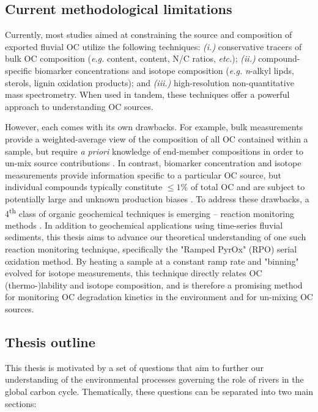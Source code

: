 \subsection{Current methodological limitations}

Currently, most studies aimed at constraining the source and composition of exported fluvial OC utilize the following techniques: \textit{(i.)} conservative tracers of bulk OC composition (\textit{e.g.}  content,  content, N/C ratios, \textit{etc.}); \textit{(ii.)} compound-specific biomarker concentrations and isotope composition (\textit{e.g.} \textit{n}-alkyl lipds, sterols, lignin oxidation products); and \textit{(iii.)} high-resolution non-quantitative mass spectrometry. When used in tandem, these techniques offer a powerful approach to understanding OC sources. 

However, each comes with its own drawbacks. For example, bulk measurements provide a weighted-average view of the composition of all OC contained within a sample, but require \textit{a priori} knowledge of end-member compositions in order to un-mix source contributions \citep{Perdue:2007fn,Weijers:2009iu,Hilton:2010cg,Hossler:2012jh}. In contrast, biomarker concentration and isotope measurements provide information specific to a particular OC source, but individual compounds typically constitute $\leq 1$\% of total OC and are subject to potentially large and unknown production biases \citep{Garcin:2014hg,Ponton:2014jr}. To address these drawbacks, a 4\textsuperscript{th} class of organic geochemical techniques is emerging -- reaction monitoring methods \citep[\textit{e.g.}][]{Rosenheim:2008ed,Follett:2014if,Beaupre:2016km}. In addition to geochemical applications using time-series fluvial sediments, this thesis aims to advance our theoretical understanding of one such reaction monitoring technique, specifically the "Ramped PyrOx" (RPO) serial oxidation method. By heating a sample at a constant ramp rate and "binning" evolved  for isotope measurements, this technique directly relates OC (thermo-)lability and isotope composition, and is therefore a promising method for monitoring OC degradation kinetics in the environment and for un-mixing OC sources.

\subsection{Thesis outline}

This thesis is motivated by a set of questions that aim to further our understanding of the environmental processes governing the role of rivers in the global carbon cycle. Thematically, these questions can be separated into two main sections:

